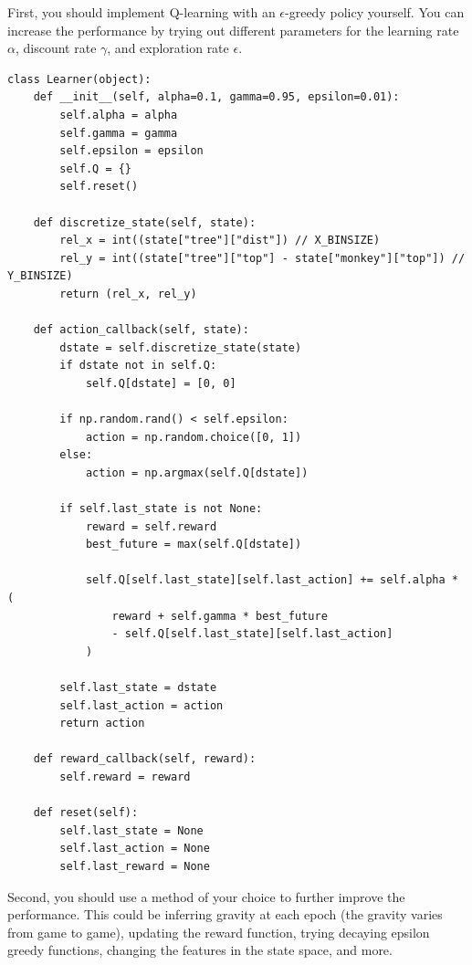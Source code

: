 \documentclass[expanded]{lkx_pset}
\begin{document}
\begin{parts}
	\begin{part}{}First, you should implement Q-learning with an
		$\epsilon$-greedy policy yourself. You can increase the performance by
		trying out different parameters for the learning rate $\alpha$,
		discount rate $\gamma$, and exploration rate $\epsilon$.
	\end{part}

	\begin{verbatim}
class Learner(object):
    def __init__(self, alpha=0.1, gamma=0.95, epsilon=0.01):
        self.alpha = alpha
        self.gamma = gamma
        self.epsilon = epsilon
        self.Q = {}
        self.reset()

    def discretize_state(self, state):
        rel_x = int((state["tree"]["dist"]) // X_BINSIZE)
        rel_y = int((state["tree"]["top"] - state["monkey"]["top"]) // Y_BINSIZE)
        return (rel_x, rel_y)

    def action_callback(self, state):
        dstate = self.discretize_state(state)
        if dstate not in self.Q:
            self.Q[dstate] = [0, 0]

        if np.random.rand() < self.epsilon:
            action = np.random.choice([0, 1])
        else:
            action = np.argmax(self.Q[dstate])

        if self.last_state is not None:
            reward = self.reward
            best_future = max(self.Q[dstate])

            self.Q[self.last_state][self.last_action] += self.alpha * (
                reward + self.gamma * best_future
                - self.Q[self.last_state][self.last_action]
            )

        self.last_state = dstate
        self.last_action = action
        return action

    def reward_callback(self, reward):
        self.reward = reward

    def reset(self):
        self.last_state = None
        self.last_action = None
        self.last_reward = None
	\end{verbatim}

	\begin{part}{}
		Second, you should use a method of your choice to further improve the performance. This could be inferring gravity at each epoch (the gravity varies from game to game), updating the reward function, trying decaying epsilon greedy functions, changing the features in the state space, and more.
	\end{part}


\end{parts}
\end{document}

